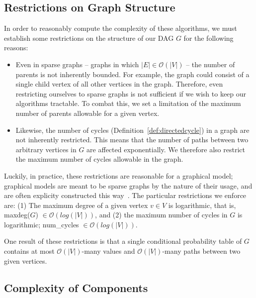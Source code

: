 \subsection{Restrictions on Graph Structure}\label{restrictions}

\null \quad \quad In order to reasonably compute the complexity of these algorithms, we must establish some restrictions on the structure of our DAG $G$ for the following reasons:
\begin{itemize}
\item Even in sparse graphs -- graphs in which $|E| \in \mathcal{O}(|V|)$ -- the number of parents is not inherently bounded. For example, the graph could consist of a single child vertex of all other vertices in the graph. Therefore, even restricting ourselves to sparse graphs is not sufficient if we wish to keep our algorithms tractable. To combat this, we set a limitation of the maximum number of parents allowable for a given vertex. 
\item Likewise, the number of cycles (Definition~\ref{def:directedcycle}) in a graph are not inherently restricted. This means that the number of paths between two arbitrary vertices in $G$ are affected exponentially. We therefore also restrict the maximum number of cycles allowable in the graph. 
\end{itemize}

\null \quad \quad Luckily, in practice, these restrictions are reasonable for a graphical model; graphical models are meant to be sparse graphs by the nature of their usage, and are often explicity constructed this way~\cite{sparse1, sparse2}. \newline
\null \quad \quad The particular restrictions we enforce are: (1) The maximum degree of a given vertex $v \in V$ is logarithmic, that is, maxdeg($G$) $\in \mathcal{O}(log(|V|))$, and (2) the maximum number of cycles in $G$ is logarithmic; num\_cycles $\in \mathcal{O}(log(|V|))$. \newline
\begin{remark} One result of these restrictions is that a single conditional probability table of $G$ contains at most $\mathcal{O}(|V|)$-many values and $\mathcal{O}(|V|)$-many paths between two given vertices. 
\end{remark}

\subsection{Complexity of Components}

